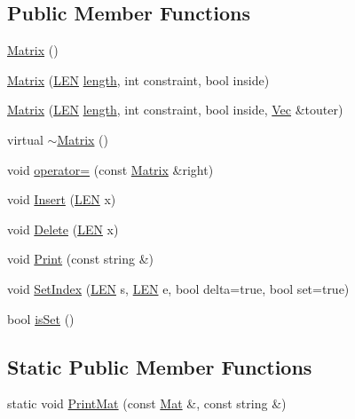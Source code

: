 \subsection*{Public Member Functions}
\begin{DoxyCompactItemize}
\item 
\hyperlink{class_rfold_1_1_matrix_a1e26cf0be8d00482470208b452d24ce8}{Matrix} ()
\item 
\hyperlink{class_rfold_1_1_matrix_a387cfcbc7b6c382d7df38af69e746933}{Matrix} (\hyperlink{energy__const_8hh_a05b49c662c073f89e86804f7856622a0}{L\+E\+N} \hyperlink{class_rfold_1_1_matrix_a4e28e0237e378feced3ce0497b0280d3}{length}, int constraint, bool inside)
\item 
\hyperlink{class_rfold_1_1_matrix_a49da7b6aa1d409c4449fc06ed97e38c5}{Matrix} (\hyperlink{energy__const_8hh_a05b49c662c073f89e86804f7856622a0}{L\+E\+N} \hyperlink{class_rfold_1_1_matrix_a4e28e0237e378feced3ce0497b0280d3}{length}, int constraint, bool inside, \hyperlink{namespace_rfold_aaf02f2c0c40c1dd572dbdd8bc1bde67d}{Vec} \&touter)
\item 
virtual \hyperlink{class_rfold_1_1_matrix_acf7cb76f2cb1cdf031520db04505b4e4}{$\sim$\+Matrix} ()
\item 
void \hyperlink{class_rfold_1_1_matrix_a4cf13f2398aaf383dc62ecd8b59c575d}{operator=} (const \hyperlink{class_rfold_1_1_matrix}{Matrix} \&right)
\item 
void \hyperlink{class_rfold_1_1_matrix_a6b8cd3d50d7349e1ec67927ce06d443f}{Insert} (\hyperlink{energy__const_8hh_a05b49c662c073f89e86804f7856622a0}{L\+E\+N} x)
\item 
void \hyperlink{class_rfold_1_1_matrix_a3a2ac53149bc491c33e695093899cfae}{Delete} (\hyperlink{energy__const_8hh_a05b49c662c073f89e86804f7856622a0}{L\+E\+N} x)
\item 
void \hyperlink{class_rfold_1_1_matrix_aaed1b655000f4a9a2cda435a4df1155d}{Print} (const string \&)
\item 
void \hyperlink{class_rfold_1_1_matrix_a6df5e3404bcfd8c490d47e2764eab7d5}{Set\+Index} (\hyperlink{energy__const_8hh_a05b49c662c073f89e86804f7856622a0}{L\+E\+N} s, \hyperlink{energy__const_8hh_a05b49c662c073f89e86804f7856622a0}{L\+E\+N} e, bool delta=true, bool set=true)
\item 
bool \hyperlink{class_rfold_1_1_matrix_a351c76b452fc81c326a97b8607196ac7}{is\+Set} ()
\end{DoxyCompactItemize}
\subsection*{Static Public Member Functions}
\begin{DoxyCompactItemize}
\item 
static void \hyperlink{class_rfold_1_1_matrix_a67cabdd52cfcbc1bde59759181f60310}{Print\+Mat} (const \hyperlink{namespace_rfold_a6392dbfbc164230455fdcdb1a0ff53d7}{Mat} \&, const string \&)
\end{DoxyCompactItemize}
